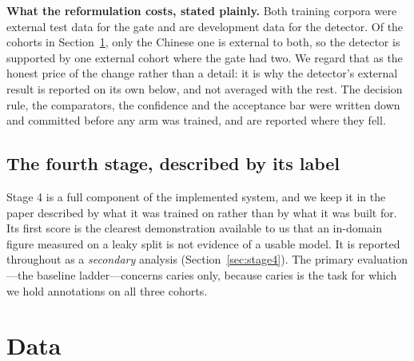 \documentclass[conference]{IEEEtran}
\begin{document}
\textbf{What the reformulation costs, stated plainly.} Both training corpora were
external test data for the gate and are development data for the detector. Of the
cohorts in Section~\ref{sec:data}, only the Chinese one is external to both, so the
detector is supported by one external cohort where the gate had two. We regard that
as the honest price of the change rather than a detail: it is why the detector's
external result is reported on its own below, and not averaged with the rest. The
decision rule, the comparators, the confidence and the acceptance bar were written
down and committed before any arm was trained, and are reported where they fell.

\subsection{The fourth stage, described by its label}
Stage 4 is a full component of the implemented system, and we keep it in the paper
described by what it was trained on rather than by what it was built for. Its first
score is the clearest demonstration available to us that an in-domain figure
measured on a leaky split is not evidence of a usable model. It is reported
throughout as a \emph{secondary} analysis (Section~\ref{sec:stage4}). The primary
evaluation---the baseline ladder---concerns caries only, because caries is the
task for which we hold annotations on all three cohorts.

\section{Data}
\label{sec:data}
\end{document}
